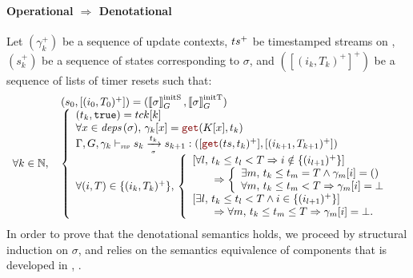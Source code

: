 \begin{skippableproof}
    \paragraph{Operational $\Rightarrow$ Denotational}
    \label{sec:semantics:grfrp:theorems:equivalence:flowop:proof:op_to_den}
    Let $(\gamma_k^+)$ be a sequence of update contexts, $ts^+$ be timestamped streams on \tck,
    $(s_k^+)$ be a sequence of states corresponding to $\sigma$, and $([(i_k, T_k)^+]^+)$ be a
    sequence of lists of timer resets such that:
    \begin{equation*}
        \begin{array}{ll}
                                 & (s_0, [(i_0, T_0)^+]) = (\initstate{\sigma}, \inittimer{\sigma}) \\
            \forall k \in \N, \, &
            \left\{
            \begin{array}{l}
                (t_k, \true) = \tck[k]                                                                     \\
                \forall x \in \depSet{\sigma}, \, \gamma_k[x] = \getAt{K[x]}{t_k}                          \\
                \sigmaOpSem{\gamma_k}{s_k}{\sigma}{t_k}{s_{k+1}}{\getAt{\ts}{t_k}^+}{(i_{k+1}, T_{k+1})^+} \\
                \forall (i, T) \in \{(i_k, T_k)^+\}, \,
                \left\{
                \begin{array}{l}
                    \left[\forall l, \, t_k \le t_l < T \Rightarrow i \notin \{(i_{l+1})^+\} \right]   \\
                    \qquad \Rightarrow
                    \left\{\begin{array}{l}
                               \exists m, \, t_k \le t_m = T \wedge \gamma_m[i] = () \\
                               \forall m, \, t_k \le t_m < T \Rightarrow \gamma_m[i] = \bot
                           \end{array}\right.                 \\
                    \left[\exists l, \, t_k \le t_l < T \wedge i \in \{(i_{l+1})^+\} \right]           \\
                    \qquad \Rightarrow \forall m, \, t_k \le t_m \le T \Rightarrow \gamma_m[i] = \bot. \\
                \end{array}
                \right.
            \end{array}
            \right.
        \end{array}
    \end{equation*}
    In order to prove that the denotational semantics  holds, we
    proceed by structural induction on $\sigma$, and relies on the semantics equivalence of \GRSync
    components that is developed in ,
    .


\end{skippableproof}

